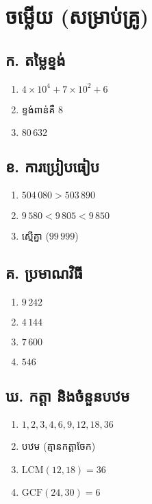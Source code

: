 \section*{ចម្លើយ (សម្រាប់គ្រូ)}

\begin{multicols}{2}
\subsection*{ក. តម្លៃខ្ទង់}
\begin{enumerate}[label=\arabic*.]
    \item $4\times10^4 + 7\times10^2 + 6$
    \item ខ្ទង់ពាន់គឺ 8
    \item $80\,632$
\end{enumerate}

\subsection*{ខ. ការប្រៀបធៀប}
\begin{enumerate}[label=\arabic*.]
    \item $504\,080 > 503\,890$
    \item $9\,580 < 9\,805 < 9\,850$
    \item ស្មើគ្នា ($99\,999$)
\end{enumerate}

\subsection*{គ. ប្រមាណវិធី}
\begin{enumerate}[label=\arabic*.]
    \item $9\,242$
    \item $4\,144$
    \item $7\,600$
    \item $546$
\end{enumerate}

\subsection*{ឃ. កត្តា និងចំនួនបឋម}
\begin{enumerate}[label=\arabic*.]
    \item $1, 2, 3, 4, 6, 9, 12, 18, 36$
    \item បឋម (គ្មានកត្តាចែក)
    \item $\mathrm{LCM}(12,18)=36$
    \item $\mathrm{GCF}(24,30)=6$
\end{enumerate}


\end{multicols}
